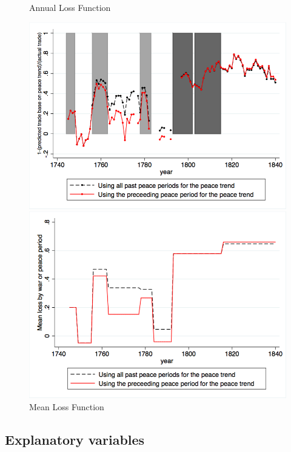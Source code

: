 \documentclass[12pt,a4paper,notitlepage,english]{article}
\begin{document}
\begin{center}
\begin{figure}[H]
\caption{Annual Loss Function}
\label{annual_loss_function}
\centering
\includegraphics[scale=.425]{Annual_loss_function.png}
\caption{Mean Loss Function}
\label{mean_loss_function}
\includegraphics[scale=.4]{Mean_loss_function.png}
\end{figure}
\end{center}
\subsection{Explanatory variables}

\end{document}

